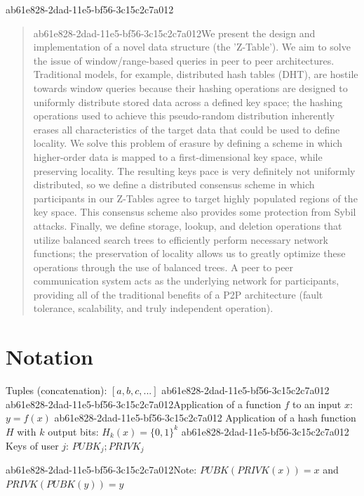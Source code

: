 \documentclass[12pt]{article}
\begin{document}
ab61e828-2dad-11e5-bf56-3c15c2c7a012
\maketitle

\begin{abstract}
ab61e828-2dad-11e5-bf56-3c15c2c7a012We present the design and implementation of a novel data structure (the 'Z-Table'). We aim to solve the issue of window/range-based queries in peer to peer architectures. Traditional models, for example,  distributed hash tables (DHT), are hostile towards window queries because their hashing operations are designed to uniformly distribute stored data across a defined key space; the hashing operations used to achieve this pseudo-random distribution inherently erases all characteristics of the target data that could be used to define locality. We solve this problem of erasure by defining a scheme in which higher-order data is mapped to a first-dimensional key space, while preserving locality. The resulting keys pace is very definitely not uniformly distributed, so we define a distributed consensus scheme in which participants in our Z-Tables agree to target highly populated regions of the key space. This consensus scheme also provides some protection from Sybil attacks. Finally, we define storage, lookup, and deletion operations that utilize balanced search trees to efficiently perform necessary network functions; the preservation of locality allows us to greatly optimize these operations through the use of balanced trees. A peer to peer communication system acts as the underlying network for participants, providing all of the traditional benefits of a P2P architecture (fault tolerance, scalability, and truly independent operation).
\end{abstract}

\section{Notation}

Tuples (concatenation): $[a,b,c,...]$
ab61e828-2dad-11e5-bf56-3c15c2c7a012
ab61e828-2dad-11e5-bf56-3c15c2c7a012Application of a function $f$ to an input $x$: $y=f(x)$
ab61e828-2dad-11e5-bf56-3c15c2c7a012
Application of a hash function $H$ with $k$ output bits: $H_{k}(x) = \{0,1\}^k$
ab61e828-2dad-11e5-bf56-3c15c2c7a012
Keys of user $j$: $ PUBK_j; PRIVK_j $

ab61e828-2dad-11e5-bf56-3c15c2c7a012Note: $PUBK(PRIVK(x)) = x$ and $PRIVK(PUBK(y)) = y$~
\end{document}
